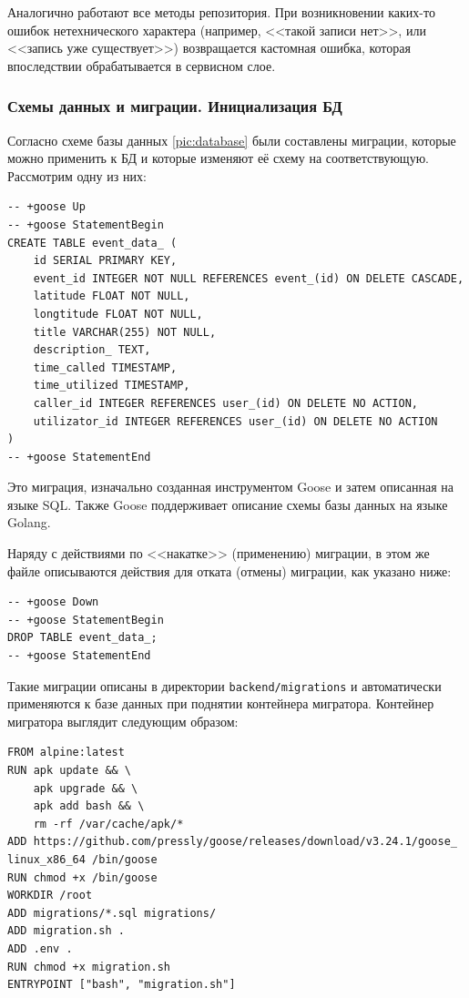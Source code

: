 \documentclass[diploma]{SCWorks}
\begin{document}
Аналогично работают все методы репозитория. При возникновении каких-то 
ошибок нетехнического характера (например, <<такой записи нет>>, или <<запись 
уже существует>>) возвращается кастомная ошибка, которая впоследствии 
обрабатывается в сервисном слое.

\subsubsection{Схемы данных и миграции. Инициализация БД}

Согласно схеме базы данных \ref{pic:database} были составлены миграции, 
которые можно применить к БД и которые изменяют её схему на соответствующую. 
Рассмотрим одну из них:

\begin{verbatim}
-- +goose Up
-- +goose StatementBegin
CREATE TABLE event_data_ (
    id SERIAL PRIMARY KEY,
    event_id INTEGER NOT NULL REFERENCES event_(id) ON DELETE CASCADE,
    latitude FLOAT NOT NULL,
    longtitude FLOAT NOT NULL,
    title VARCHAR(255) NOT NULL,
    description_ TEXT,
    time_called TIMESTAMP,
    time_utilized TIMESTAMP,
    caller_id INTEGER REFERENCES user_(id) ON DELETE NO ACTION,
    utilizator_id INTEGER REFERENCES user_(id) ON DELETE NO ACTION
)
-- +goose StatementEnd
\end{verbatim}

Это миграция, изначально созданная инструментом Goose и затем описанная на 
языке SQL. Также Goose поддерживает описание схемы базы данных на 
языке Golang.

Наряду с действиями по <<накатке>> (применению) миграции, в этом же файле 
описываются действия для отката (отмены) миграции, как указано ниже:

\begin{verbatim}
-- +goose Down
-- +goose StatementBegin
DROP TABLE event_data_;
-- +goose StatementEnd
\end{verbatim}

Такие миграции описаны в директории \texttt{backend/migrations} и автоматически
применяются к базе данных при поднятии контейнера мигратора.
Контейнер мигратора выглядит следующим образом:
\begin{verbatim}
FROM alpine:latest
RUN apk update && \
    apk upgrade && \
    apk add bash && \
    rm -rf /var/cache/apk/*
ADD https://github.com/pressly/goose/releases/download/v3.24.1/goose_
linux_x86_64 /bin/goose
RUN chmod +x /bin/goose
WORKDIR /root
ADD migrations/*.sql migrations/
ADD migration.sh .
ADD .env .
RUN chmod +x migration.sh
ENTRYPOINT ["bash", "migration.sh"]
\end{verbatim}
\end{document}
